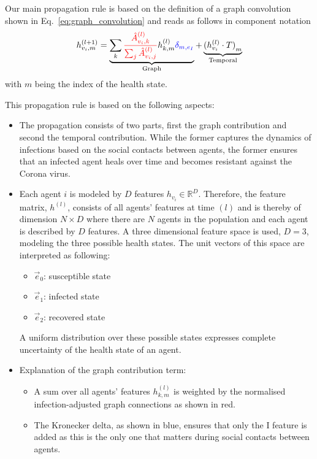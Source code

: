 Our main propagation rule is based on the definition of a graph convolution shown in Eq.~\eqref{eq:graph_convolution} and reads as follows in component notation
\begin{equation}
	h_{v_i, m}^{(l+1)}
	=
	\underbrace{
		\sum_k \textcolor{red}{\frac{\hat{A}_{v_i, k}^{(l)}}{\sum_j \hat{A}_{v_i, j}^{(l)}}} h_{k, m}^{(l)} \textcolor{blue}{\delta_{m, e_I}}
	}_{\text{Graph}}
	+
	\underbrace{
		{(h_{v_i}^{(l)}\cdot T)}_m
	}_{\text{Temporal}}
\end{equation}
with $m$ being the index of the health state.

This propagation rule is based on the following aspects:

\begin{itemize}
	\item The propagation consists of two parts, first the graph contribution and second the temporal contribution. While the former captures the dynamics of infections based on the social contacts between agents, the former ensures that an infected agent heals over time and becomes resistant against the Corona virus.
	\item Each agent $i$ is modeled by $D$ features $h_{v_i}\in\mathbb{R}^D$. Therefore, the feature matrix, $h^{(l)}$, consists of all agents' features at time $(l)$ and is thereby of dimension $N\times D$ where there are $N$ agents in the population and each agent is described by $D$ features. A three dimensional feature space is used, $D=3$, modeling the three possible health states. The unit vectors of this space are interpreted as following:
	\begin{itemize}
		\item $\vec{e}_0$: susceptible state
		\item $\vec{e}_1$: infected state
		\item $\vec{e}_2$: recovered state
	\end{itemize}
	A uniform distribution over these possible states expresses complete uncertainty of the health state of an agent.
	\item Explanation of the graph contribution term:
	\begin{itemize}
		\item A sum over all agents' features $h_{k,m}^{(l)}$ is weighted by the normalised infection-adjusted graph connections as shown in red.
		\item The Kronecker delta, as shown in blue, ensures that only the I feature is added as this is the only one that matters during social contacts between agents.

\end{itemize}
\end{itemize}
